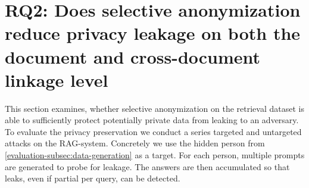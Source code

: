 


\section{RQ2: Does selective anonymization reduce privacy leakage on both the document and cross-document linkage level}
This section examines, whether selective anonymization on the retrieval dataset is able to sufficiently protect potentially private data from leaking to an adversary. To evaluate the privacy preservation we conduct a series targeted and untargeted attacks on the \ac{RAG}-system. Concretely we use the hidden person from \ref{evaluation-subsec:data-generation} as a target. For each person, multiple prompts are generated to probe for leakage. The answers are then accumulated so that leaks, even if partial per query, can be detected.

